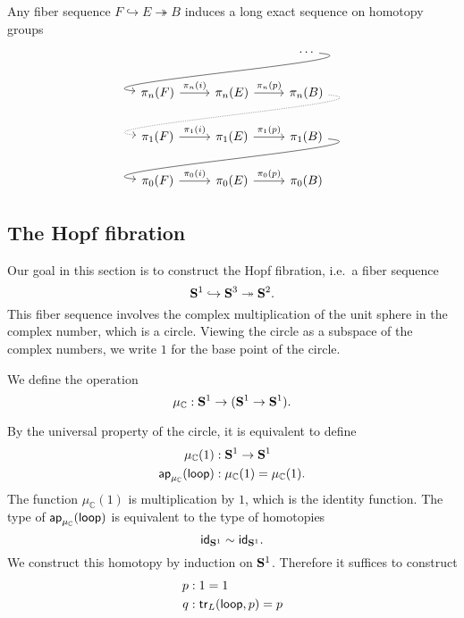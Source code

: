 \begin{thm}
Any fiber sequence $F\hookrightarrow E\twoheadrightarrow B$ induces a long exact sequence on homotopy groups
\begin{equation*}
\begin{tikzcd}
& & \cdots \arrow[out=355,in=175,dll] \\
\pi_n(F) \arrow[r,"\pi_n(i)"] & \pi_n(E) \arrow[r,"\pi_n(p)"] & \pi_n(B) \arrow[out=355,in=175,dll,densely dotted] \\
\pi_1(F) \arrow[r,"\pi_1(i)"] & \pi_1(E) \arrow[r,"\pi_1(p)"] & \pi_1(B) \arrow[out=355,in=175,dll] \\
\pi_0(F) \arrow[r,"\pi_0(i)"] & \pi_0(E) \arrow[r,"\pi_0(p)"] & \pi_0(B)
\end{tikzcd}
\end{equation*}
\end{thm}

\subsection{The Hopf fibration}
Our goal in this section is to construct the Hopf fibration, i.e.~a fiber sequence
\begin{equation*}
\sphere{1}\hookrightarrow\sphere{3}\twoheadrightarrow\sphere{2}.
\end{equation*}
This fiber sequence involves the complex multiplication of the unit sphere in the complex number, which is a circle. Viewing the circle as a subspace of the complex numbers, we write $1$ for the base point of the circle.

\begin{defn}
We define the  operation
\begin{equation*}
\mu_{\mathbb{C}}:\sphere{1}\to(\sphere{1}\to\sphere{1}).
\end{equation*}
\end{defn}

\begin{constr}
By the universal property of the circle, it is equivalent to define
\begin{align*}
\mu_{\mathbb{C}}(1) & : \sphere{1}\to\sphere{1} \\
\ap{\mu_{\mathbb{C}}}{\lloop} & : \mu_{\mathbb{C}}(1)=\mu_{\mathbb{C}}(1). 
\end{align*}
The function $\mu_{\mathbb{C}}(1)$ is multiplication by $1$, which is the identity function. The type of $\ap{\mu_{\mathbb{C}}}{\lloop}$ is equivalent to the type of homotopies
\begin{equation*}
\idfunc[\sphere{1}] \htpy \idfunc[\sphere{1}]. 
\end{equation*}
We construct this homotopy by induction on $\sphere{1}$. Therefore it suffices to construct
\begin{align*}
p & : 1=1 \\
q & : \mathsf{tr}_{L}(\lloop,p)=p
\end{align*}
\end{constr}

